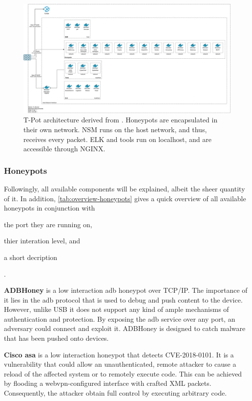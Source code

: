 \begin{figure}
    \centering
    \includegraphics[width=\textwidth]{figures/tpot-architecture.pdf}
    \caption[T-Pot architecture]{T-Pot architecture derived from \cite{tpot}. Honeypots are encapsulated in their own network. NSM runs on the host network, and thus, receives every packet. ELK and tools run on localhost, and are accessible through NGINX.}
    \label{fig:overview-tpot}
\end{figure}

\subsubsection{Honeypots}

Followingly, all available components will be explained, albeit the sheer quantity of it.
In addition, \autoref{tab:overview-honeypots} gives a quick overview of all available honeypots in conjunction with
\begin{enumerate*}[label=(\roman*)]
    \item the port they are running on,
    \item thier interation level, and
    \item a short decription
\end{enumerate*}.

\textbf{ADBHoney} \cite{adbhoney2021} is a low interaction \ac{adb} honeypot over TCP/IP.
The importance of it lies in the \ac{adb} protocol that is used to debug and push content to the device.
However, unlike USB it does not support any kind of ample mechanisms of authentication and protection.
By exposing the \ac{adb} service over any port, an adversary could connect and exploit it.
ADBHoney is designed to catch malware that has been pushed onto devices.

\textbf{Cisco \ac{asa}} \cite{cymmetria2018} is a low interaction honeypot that detects CVE-2018-0101\cite{CVE-2018-0101}.
It is a vulnerability that could allow an unauthenticated, remote attacker to cause a reload of the affected system or to remotely execute code.
This can be achieved by flooding a webvpn-configured interface with crafted XML packets.
Consequently, the attacker obtain full control by executing arbitrary code.

